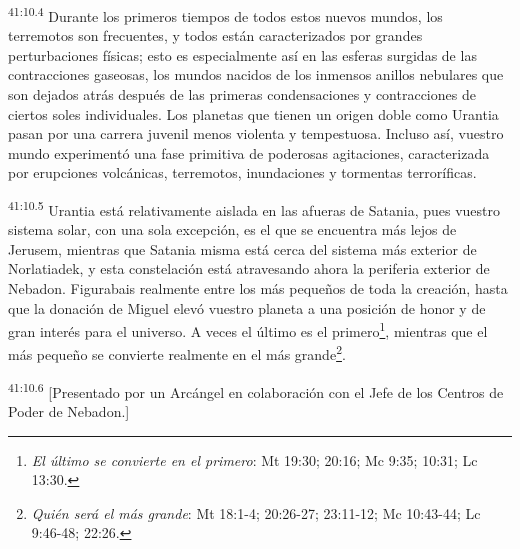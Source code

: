 \par
\textsuperscript{41:10.4} Durante los primeros tiempos de todos estos nuevos mundos, los terremotos son frecuentes, y todos están caracterizados por grandes perturbaciones físicas; esto es especialmente así en las esferas surgidas de las contracciones gaseosas, los mundos nacidos de los inmensos anillos nebulares que son dejados atrás después de las primeras condensaciones y contracciones de ciertos soles individuales. Los planetas que tienen un origen doble como Urantia pasan por una carrera juvenil menos violenta y tempestuosa. Incluso así, vuestro mundo experimentó una fase primitiva de poderosas agitaciones, caracterizada por erupciones volcánicas, terremotos, inundaciones y tormentas terroríficas.

\par
\textsuperscript{41:10.5} Urantia está relativamente aislada en las afueras de Satania, pues vuestro sistema solar, con una sola excepción, es el que se encuentra más lejos de Jerusem, mientras que Satania misma está cerca del sistema más exterior de Norlatiadek, y esta constelación está atravesando ahora la periferia exterior de Nebadon. Figurabais realmente entre los más pequeños de toda la creación, hasta que la donación de Miguel elevó vuestro planeta a una posición de honor y de gran interés para el universo. A veces el último es el primero\footnote{\textit{El último se convierte en el primero}: Mt 19:30; 20:16; Mc 9:35; 10:31; Lc 13:30.}, mientras que el más pequeño se convierte realmente en el más grande\footnote{\textit{Quién será el más grande}: Mt 18:1-4; 20:26-27; 23:11-12; Mc 10:43-44; Lc 9:46-48; 22:26.}.

\par
\textsuperscript{41:10.6} [Presentado por un Arcángel en colaboración con el Jefe de los Centros de Poder de Nebadon.]